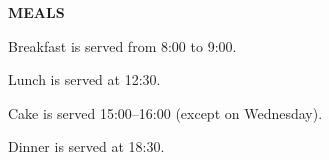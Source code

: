 \documentclass[11pt]{article}
\begin{document}
\begin{center}
{\bf MEALS}
\end{center}

%


%   
%   


\begin{compactitem}
\item
  Breakfast is served from  8:00 to 9:00.
\item
  Lunch is served at 12:30.
\item
  Cake is served 15:00--16:00 (except on Wednesday).
\item
  Dinner is served at 18:30.
\end{compactitem}


%
%
\end{document}
